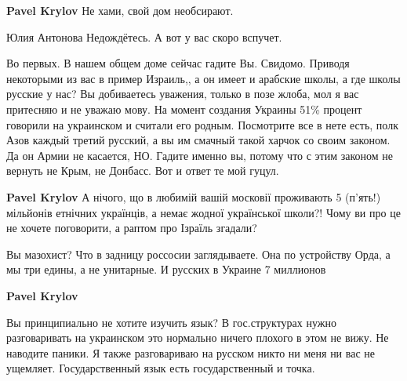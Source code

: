 \begin{itemize}
\begin{itemize}
 
\textbf{Pavel Krylov} Не хами, свой дом необсирают.

 
Юлия Антонова Недождётесь. А вот у вас скоро вспучет.

 

Во первых. В нашем общем доме сейчас гадите Вы. Свидомо. Приводя некоторыми из
вас в пример Израиль,, а он имеет и арабские школы, а где школы русские у нас? Вы
добиваетесь уважения, только в позе жлоба, мол я вас притесняю и не уважаю
мову. На момент создания Украины 51\% процент говорили на украинском и считали
его родным. Посмотрите все в нете есть, полк Азов каждый третий русский, а вы им
смачный такой харчок со своим законом. Да он Армии не касается, НО. Гадите именно
вы, потому что с этим законом не вернуть не Крым, не Донбасс. Вот и ответ те мой
гуцул.

 
\textbf{Pavel Krylov} А нічого, що в любимій вашій московії проживають 5 (п'ять!) мільйонів етнічних українців, а немає жодної української школи?! Чому ви про це не хочете поговорити, а раптом про Ізраїль згадали?

 

Вы мазохист? Что в задницу россосии заглядываете. Она по
устройству Орда, а мы три едины, а не унитарные. И русских в Украине 7
миллионов


 
\textbf{Pavel Krylov} 

Вы принципиально не хотите изучить язык? В гос.структурах нужно разговаривать
на украинском это нормально ничего плохого в этом не вижу. Не наводите паники.
Я также разговариваю на русском никто ни меня ни вас не ущемляет.
Государственный язык есть государственный и точка.


\end{itemize}
\end{itemize}
